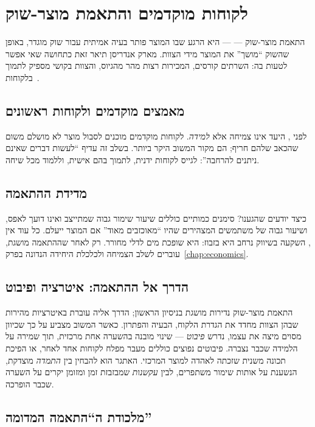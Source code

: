 \chapter{לקוחות מוקדמים והתאמת מוצר-שוק}
\label{chap:pmf}

התאמת מוצר-שוק —  — היא הרגע שבו המוצר פותר בעיה
אמיתית עבור שוק מוגדר, באופן שהשוק ``מושך'' את המוצר מידי הצוות. מארק אנדריסן
תיאר זאת כתחושה שאי אפשר לטעות בה: השרתים קורסים, המכירות רצות מהר מהגיוס,
והצוות בקושי מספיק לתמוך בלקוחות~\cite{andreessen2007pmf}.

\section{מאמצים מוקדמים ולקוחות ראשונים}

לפני , היעד אינו צמיחה אלא \emph{למידה}. לקוחות מוקדמים
 מוכנים לסבול מוצר לא מושלם משום שהכאב שלהם חריף; הם
מקור המשוב היקר ביותר. בשלב זה עדיף ``לעשות דברים שאינם ניתנים להרחבה'':
לגייס לקוחות ידנית, לתמוך בהם אישית, וללמוד מכל שיחה.

\section{מדידת ההתאמה}

כיצד יודעים שהגענו? סימנים כמותיים כוללים שיעור שימור גבוה
 שמתייצב ואינו דועך לאפס, ושיעור גבוה של משתמשים המצהירים
שהיו ``מאוכזבים מאוד'' אם המוצר ייעלם. כל עוד אין , השקעה בשיווק נרחב
היא בזבוז: היא שופכת מים לדלי מחורר. רק לאחר שההתאמה מושגת, עוברים לשלב הצמיחה
ולכלכלת היחידה הנדונה בפרק~\ref{chap:economics}.

\section{הדרך אל ההתאמה: איטרציה ופיבוט}

התאמת מוצר-שוק נדירות מושגת בניסיון הראשון; הדרך אליה עוברת באיטרציות מהירות
שבהן הצוות מחדד את הגדרת הלקוח, הבעיה והפתרון. כאשר המשוב מצביע על כך שכיוון
מסוים מיצה את עצמו, נדרש \emph{פיבוט}  — שינוי מובנה בהשערה אחת
מרכזית, תוך שמירה על הלמידה שכבר נצברה. פיבוטים נפוצים כוללים מעבר מפלח לקוחות
אחד לאחר, או הפיכת תכונה משנית שזכתה לאהדה למוצר המרכזי. האתגר הוא להבחין בין
\emph{התמדה} מוצדקת, הנשענת על אותות שימור משתפרים, לבין \emph{עקשנות} שמבזבזת
זמן ומזומן יקרים על השערה שכבר הופרכה.

\section{מלכודת ה``התאמה המדומה''}

